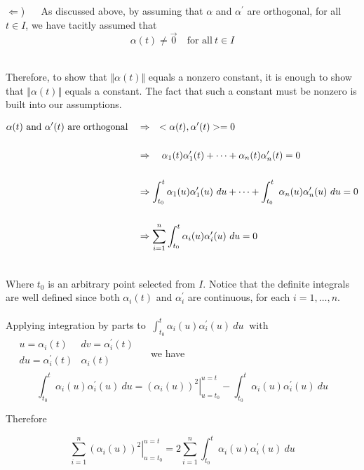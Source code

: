 \documentclass[12pt,letterpaper]{hmcpset}
\begin{document}
\begin{solution}
\newpage

$\Leftarrow$)  $ \quad$   As discussed above, by assuming  that $\alpha$ and $\alpha^{\prime}$ are orthogonal, for all $t \in I$, we have tacitly assumed that 
\[ \alpha(t) \neq \vec0 \quad \text{for all} \ t \in I\]\

Therefore, to show that $\Vert \alpha(t) \Vert$ equals a nonzero constant, it is enough to show that $\Vert \alpha(t) \Vert$  equals a constant.  The fact that such a constant must be nonzero is built into our assumptions.

\begin{align}
\alpha(t)\ \text{and} \ \alpha^{\prime}(t)\ \text{are orthogonal} \quad &\Rightarrow \quad <\alpha(t),\alpha^{\prime}(t)> =0 \notag\\
\quad\notag\\
&\Rightarrow \quad \alpha_1(t)\alpha_1^{\prime}(t) + \dots + \alpha_n(t)\alpha_n^{\prime}(t) \notag = 0\notag\\
\quad\notag\\
&\Rightarrow \int_{t_0}^t\alpha_1(u)\alpha_1^{\prime}(u)\ du+ \dots +\int_{t_0}^t\ \alpha_n(u)\alpha_n^{\prime}(u)\ du \notag = 0\notag\\
\quad\notag\\
&\Rightarrow \sum_{i=1}^n \int_{t_0}^t\alpha_i(u)\alpha_i^{\prime}(u)\ du = 0 \notag\\
\notag
\end{align}

Where $t_0$ is an arbitrary point selected from $I$. Notice that the definite integrals are well defined since both $\alpha_i(t)$ and $\alpha_i^{\prime}$ are continuous, for each $i = 1,\dots,n$.\\
\\
Applying integration by parts to $\ \int_{t_0}^t\alpha_i(u) \alpha_i^{\prime}(u)\ du\ $ with 
$ \quad
\begin{smallmatrix}
u=\alpha_i(t) & dv = \alpha_i^{\prime}(t)\\
du = \alpha_i^{\prime}(t)& \alpha_i(t)\\
\end{smallmatrix}
\quad$
we have \\

\[ \int_{t_0}^t\alpha_i(u)\alpha_i^{\prime}(u)\ du = \left.(\alpha_i(u))^2\right|_{u=t_0}^{u=t} -  \int_{t_0}^t\alpha_i(u)\alpha_i^{\prime}(u)\ du \]

Therefore

\[ \sum_{i=1}^n\left.(\alpha_i(u))^2\right|_{u=t_0}^{u=t} =2\sum_{i=1}^n \int_{t_0}^t\alpha_i(u)\alpha_i^{\prime}(u)\ du \]\


\end{solution}
\end{document}
